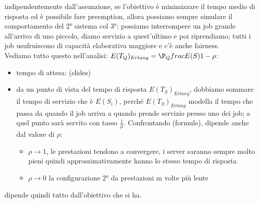\documentclass{article}
\begin{document}
indipendentemente dall'assunzione, se l'obiettivo è minimizzare il tempo medio di risposta ed è possibile fare preemption, allora possiamo sempre simulare il comportamento del 2° sistema col 3°: possiamo interrompere un job grande all'arrivo di uno piccolo, diamo servizio a quest'ultimo e poi riprendiamo; tutti i job usufruiscono di capacità elaborativa maggiore e c'è anche fairness.\\ Vediamo tutto questo nell'analisi: $E(T_Q)_{Erlang} = \P_Qfrac{E(S)}{1 - \rho}$:
\begin{itemize}
\item tempo di attesa: (slides)
\item da un punto di vista del tempo di risposta $E(T_S)_{Erlang}$, dobbiamo sommare il tempo di servizio che è $E(S_i)$, perché $E(T_S)_{Erlang}$ modella il tempo che passa da quando il job arriva a quando prende servizio presso uno dei job; a quel punto sarà servito con tasso $\frac{1}{\mu}$. Confrontando (formule), dipende anche dal valore di $\rho$:
\begin{itemize}
\item $\rho \longrightarrow 1$, le prestazioni tendono a convergere, i server saranno sempre molto pieni quindi approssimativamente hanno lo stesso tempo di risposta
\item $\rho \longrightarrow 0$ la configurazione 2° da prestazioni m volte più lente
\end{itemize}
\end{itemize}
dipende quindi tutto dall'obiettivo che si ha.\\ 
\end{document}

